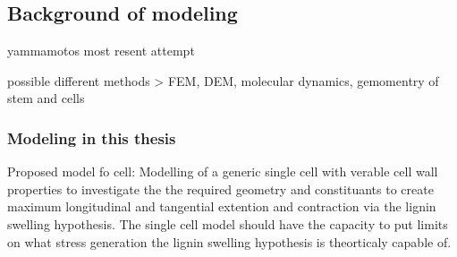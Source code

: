 \documentclass{article}
\begin{document}
%
%




\subsection{Background of modeling}

yammamotos most resent attempt

possible different methods > FEM, DEM, molecular dynamics, gemomentry of stem
and cells

\subsubsection{Modeling in this thesis}
%
%
%
%
%
%
%
%
%
%
%


Proposed model fo cell:
Modelling of a generic single cell with verable cell wall properties to
investigate the the required geometry and constituants to create maximum
longitudinal and tangential extention and contraction via the lignin swelling
hypothesis. The single cell model should have the capacity to put limits on what
stress generation the lignin swelling hypothesis is theorticaly capable of.
\end{document}
